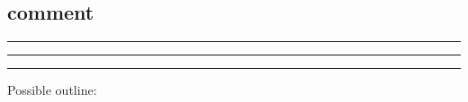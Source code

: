 \documentclass[12pt,a4paper]{article}
\newcommand{\tp}{\otimes}
\newcommand{\unit}{\mathds{1}}
\newcommand{\mcb}{\mathcal{B}}
\newcommand{\mcd}{\mathcal{D}}
\newcommand\be            {\begin{equation}}
\newcommand\ee            {\end{equation}}
\newcommand{\End}{\text{End}}
\newcommand{\kwsep}{\bigskip\hrule\medskip\hrule\medskip\hrule\bigskip}
\begin{document}

\subsection{comment}
\kwsep

Possible outline:
\end{document}
